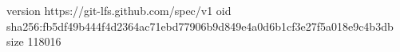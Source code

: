version https://git-lfs.github.com/spec/v1
oid sha256:fb5df49b444f4d2364ac71ebd77906b9d849e4a0d6b1cf3e27f5a018e9c4b3db
size 118016
